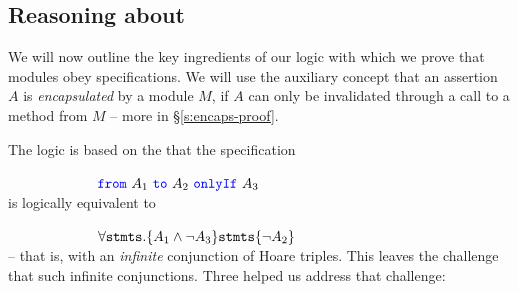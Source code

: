 \subsection{Reasoning about \Nec}
\label{s:approach}

{We will now outline the key ingredients of  our logic with which we prove
that modules obey \Nec specifications. 
We will use the auxiliary concept that  
an assertion $A$ is \emph{encapsulated} by
a module $M$, if  $A$  can only be invalidated through 
a call to a method from $M$ -- more   in \S \ref{s:encaps-proof}.}

 
% 

The \Nec logic is based on the  that the specification\\
\strut $\hspace{1in}$  ${\color{blue}\texttt{from}}\ A_1\ {\color{blue}\texttt{to}}\ A_2\ {\color{blue}\texttt{onlyIf}}\ A_3$
\\
 is  logically equivalent {to} \\
 \strut $\hspace{1in}$  $\forall {\texttt{stmts}}. \{ A_1 \wedge \neg A_3\} {\texttt{stmts}} \{ \neg A_2 \}$\\
 -- that is,
 with an \emph{infinite} conjunction  of Hoare triples. 
This leaves the challenge that  such infinite conjunctions.
 Three  helped us address   that challenge: 

